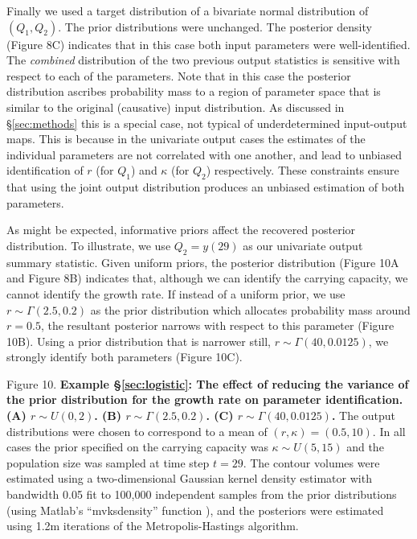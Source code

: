 \documentclass[10pt,letterpaper]{article}
\begin{document}
Finally we used a target distribution of a bivariate normal distribution of $(Q_1,Q_2)$. The prior distributions were unchanged. The posterior density (Figure 8C) indicates that in this case both input parameters were well-identified. The \emph{combined} distribution of the two previous output statistics is sensitive with respect to each of the parameters. Note that in this case the posterior distribution ascribes probability mass to a region of parameter space that is similar to the original (causative) input distribution. As discussed in \S \ref{sec:methods} this is a special case, not typical of underdetermined input-output maps. This is because in the univariate output cases the estimates of the individual parameters are not correlated with one another, and lead to unbiased identification of $r$ (for $Q_1$) and $\kappa$ (for $Q_2$) respectively. These constraints ensure that using the joint output distribution produces an unbiased estimation of both parameters.

As might be expected, informative priors affect the recovered posterior distribution. To illustrate, we use $Q_2=y(29)$ as our univariate output summary statistic. Given uniform priors, the posterior distribution (Figure 10A and Figure 8B) indicates that, although we can identify the carrying capacity, we cannot identify the growth rate. If instead of a uniform prior, we use $r\sim \Gamma(2.5,0.2)$ as the prior distribution which allocates probability mass around $r=0.5$, the resultant posterior narrows with respect to this parameter (Figure 10B). Using a prior distribution that is narrower still, $r\sim \Gamma(40,0.0125)$, we strongly identify both parameters (Figure 10C).

\vspace{0.5cm}

Figure 10. {\bf Example \S \ref{sec:logistic}:  The effect of reducing the variance of the prior distribution for the growth rate on parameter identification. (A) $r\sim U(0,2)$. (B) $r\sim \Gamma(2.5,0.2)$. (C) $r\sim \Gamma(40,0.0125)$.} The output distributions were chosen to correspond to a mean of $(r,\kappa)=(0.5,10)$. In all cases the prior specified on the carrying capacity was $\kappa\sim U(5,15)$ and the population size was sampled at time step $t=29$. The contour volumes were estimated using a two-dimensional Gaussian kernel density estimator with bandwidth 0.05 fit to 100,000 independent samples from the prior distributions (using Matlab's ``mvksdensity'' function \cite{MATLAB:2016}), and the posteriors were estimated using 1.2m iterations of the Metropolis-Hastings algorithm.
\end{document}

